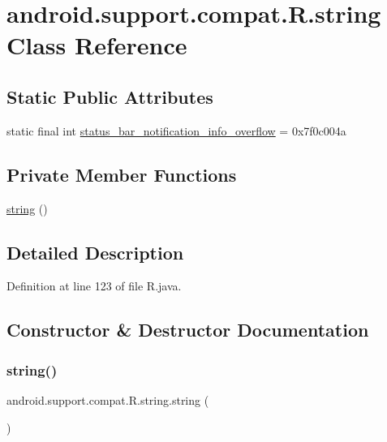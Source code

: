 \hypertarget{classandroid_1_1support_1_1compat_1_1_r_1_1string}{}\section{android.\+support.\+compat.\+R.\+string Class Reference}
\label{classandroid_1_1support_1_1compat_1_1_r_1_1string}
\subsection*{Static Public Attributes}
\begin{DoxyCompactItemize}
\item 
static final int \mbox{\hyperlink{classandroid_1_1support_1_1compat_1_1_r_1_1string_a7529efba925b9ba0a8d7ae1cab99f9db}{status\+\_\+bar\+\_\+notification\+\_\+info\+\_\+overflow}} = 0x7f0c004a
\end{DoxyCompactItemize}
\subsection*{Private Member Functions}
\begin{DoxyCompactItemize}
\item 
\mbox{\hyperlink{classandroid_1_1support_1_1compat_1_1_r_1_1string_ad5967601bca66f9012754d60c7c9e4d5}{string}} ()
\end{DoxyCompactItemize}


\subsection{Detailed Description}


Definition at line 123 of file R.\+java.



\subsection{Constructor \& Destructor Documentation}
\mbox{\label{classandroid_1_1support_1_1compat_1_1_r_1_1string_ad5967601bca66f9012754d60c7c9e4d5}} 
\subsubsection{\texorpdfstring{string()}{string()}}
{\footnotesize\ttfamily android.\+support.\+compat.\+R.\+string.\+string (\begin{DoxyParamCaption}{ }\end{DoxyParamCaption})\hspace{0.3cm}{\ttfamily [private]}}



